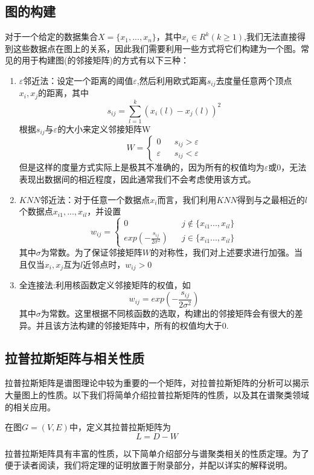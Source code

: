 \documentclass[11pt]{scrartcl}
\begin{document}
\subsection{图的构建}
对于一个给定的数据集合$X=\{x_1,...,x_n\}$，其中$x_i\in R^k(k\ge1)$,我们无法直接得到这些数据点在图上的关系，因此我们需要利用一些方式将它们构建为一个图。常见的用于构建图(的邻接矩阵)的方式有以下三种：
\begin{enumerate}
\item $\varepsilon$邻近法：设定一个距离的阈值$\varepsilon$,然后利用欧式距离$s_{ij}$去度量任意两个顶点$x_i,x_j$的距离，其中
$$
s_{ij}=\sum_{l=1}^k (x_i(l)-x_j(l))^2
$$
根据$s_{ij}$与$\varepsilon$的大小来定义邻接矩阵W
$$
W=\left\{
\begin{aligned}
0&&s_{ij}>\varepsilon\\
\varepsilon &&s_{ij}<\varepsilon
\end{aligned}
\right.
$$
但是这样的度量方式实际上是极其不准确的，因为所有的权值均为$\varepsilon$或0，无法表现出数据间的相近程度，因此通常我们不会考虑使用该方式。


\item $KNN$邻近法：对于任意一个数据点$x_i$而言，我们利用$KNN$得到与之最相近的$l$个数据点$x_{i1},...,x_{il}$，并设置
$$
w_{ij}=\left\{
\begin{aligned}
0&&j \not\in \{x_{i1}...,x_{il}\}\\
exp(-\frac{s_{ij}}{2\sigma^2}) &&j\in \{x_{i1}...,x_{il}\}
\end{aligned}
\right.
$$
其中$\sigma$为常数。为了保证邻接矩阵$W$的对称性，我们对上述要求进行加强。当且仅当$x_i,x_j$互为$l$近邻点时，$w_{ij}>0$

\item 全连接法:利用核函数定义邻接矩阵的权值，如
$$
w_{ij}=exp(-\frac{s_{ij}}{2\sigma^2})
$$
其中$\sigma$为常数。这里根据不同核函数的选取，构建出的邻接矩阵会有很大的差异。并且该方法构建的邻接矩阵中，所有的权值均大于0.
\end{enumerate}


\subsection{拉普拉斯矩阵与相关性质}
拉普拉斯矩阵是谱图理论中较为重要的一个矩阵，对拉普拉斯矩阵的分析可以揭示大量图上的性质。以下我们将简单介绍拉普拉斯矩阵的性质，以及其在谱聚类领域的相关应用。
\begin{definition}[拉普拉斯矩阵$L$]
在图$G=(V,E)$中，定义其拉普拉斯矩阵为
$$
L=D-W
$$
\end{definition}
拉普拉斯矩阵具有丰富的性质，以下简单介绍部分与谱聚类相关的性质定理。为了便于读者阅读，我们将定理的证明放置于附录部分，并配以详实的解释说明。
\end{document}
